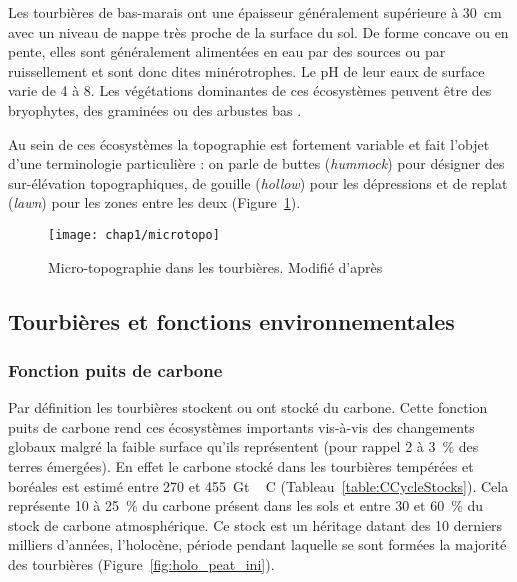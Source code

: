 Les tourbières de bas-marais ont une épaisseur généralement supérieure à \SI{30}{\cm} avec un niveau de nappe très proche de la surface du sol.
De forme concave ou en pente, elles sont généralement alimentées en eau par des sources ou par ruissellement et sont donc dites minérotrophes.
Le pH de leur eaux de surface varie de 4 à 8.
Les végétations dominantes de ces écosystèmes peuvent être des bryophytes, des graminées ou des arbustes bas \citep{rydin2013a}.

Au sein de ces écosystèmes la topographie est fortement variable et fait l'objet d'une terminologie particulière : on parle de buttes (\textit{hummock}) pour désigner des sur-élévation topographiques, de gouille (\textit{hollow}) pour les dépressions et de replat (\textit{lawn}) pour les zones entre les deux (Figure~\ref{fig:microtopo}).


\begin{figure}[t]
\centering
\texttt{[image: chap1/microtopo]}
\caption{Micro-topographie dans les tourbières. Modifié d'après \citet{rydin2013a}}
\label{fig:microtopo}
\end{figure}

\subsection{Tourbières et fonctions environnementales}

\subsubsection{Fonction puits de carbone}
Par définition les tourbières stockent ou ont stocké du carbone.
Cette fonction puits de carbone rend ces écosystèmes importants vis-à-vis des changements globaux malgré la faible surface qu'ils représentent (pour rappel 2 à \SI{3}{\percent} des terres émergées).
En effet le carbone stocké dans les tourbières tempérées et boréales est estimé entre 270 et \SI{455}{\giga\tonne\,C} (Tableau~\ref{table:CCycleStocks}).
Cela représente 10 à \SI{25}{\percent} du carbone présent dans les sols et entre 30 et \SI{60}{\percent} du stock de carbone atmosphérique.
Ce stock est un héritage datant des 10 derniers milliers d'années, l'holocène, période pendant laquelle se sont formées la majorité des tourbières \citep{yu2010,macdonald2006} (Figure~\ref{fig:holo_peat_ini}).

